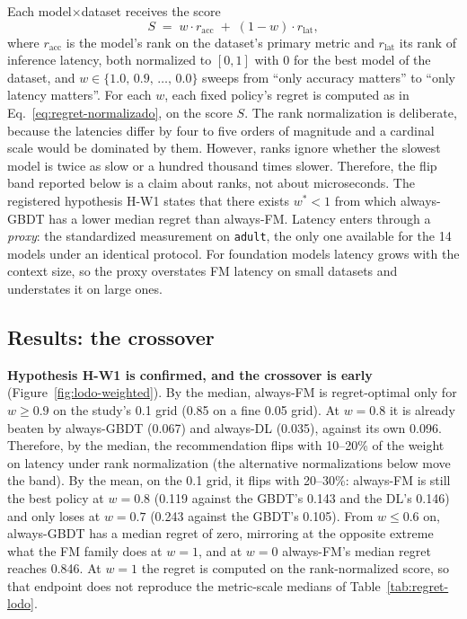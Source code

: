 Each model$\times$dataset receives the score
\begin{equation}
S \;=\; w \cdot r_{\text{acc}} \;+\; (1-w) \cdot r_{\text{lat}},
\label{eq:score-ponderado}
\end{equation}
where $r_{\text{acc}}$ is the model's rank on the dataset's primary
metric and $r_{\text{lat}}$ its rank of inference latency, both normalized to $[0,1]$ with 0 for the best model of the
dataset, and $w \in \{1.0,\, 0.9,\, \ldots,\, 0.0\}$ sweeps
from ``only accuracy matters'' to ``only latency matters''. For each
$w$, each fixed policy's regret is computed as in
Eq.~\ref{eq:regret-normalizado}, on the score $S$. The rank
normalization is deliberate, because the latencies differ by four to
five orders of magnitude and a cardinal scale would be dominated by
them. However, ranks ignore whether the slowest model is twice as
slow or a hundred thousand times slower. Therefore, the flip band reported below is a claim about ranks, not about microseconds.
The registered hypothesis H-W1 states that there exists $w^{*} < 1$
from which always-GBDT has a lower median regret than always-FM.
Latency enters through a \emph{proxy}: the standardized measurement on \texttt{adult}, the only one available for the 14 models under an identical protocol. For foundation models latency grows with the context size, so the proxy overstates
FM latency on small datasets and understates it on large ones.

\subsection{Results: the crossover}
\label{sec:e2-resultados}

\textbf{Hypothesis H-W1 is confirmed, and the crossover is early}
(Figure~\ref{fig:lodo-weighted}). By the median, always-FM is
regret-optimal only for $w \geq 0.9$ on the study's 0.1 grid (0.85 on
a fine 0.05 grid). At $w{=}0.8$ it is already beaten by always-GBDT
(0.067) and always-DL (0.035), against its own 0.096. Therefore, by the median, the recommendation flips with 10--20\% of the weight on latency under rank normalization (the alternative normalizations below move the band). By the mean, on the 0.1 grid, it flips with 20--30\%: always-FM is still the best policy at $w{=}0.8$
(0.119 against the GBDT's 0.143 and the DL's 0.146) and only loses at
$w{=}0.7$ (0.243 against the GBDT's 0.105). From $w \leq 0.6$ on,
always-GBDT has a median regret of zero, mirroring at the
opposite extreme what the FM family does at $w{=}1$, and at $w{=}0$ always-FM's median regret reaches 0.846. At $w{=}1$ the regret is computed on the rank-normalized score, so that endpoint does not reproduce the metric-scale medians of Table~\ref{tab:regret-lodo}.

